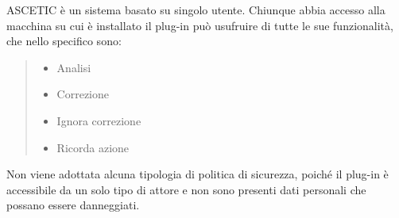 


ASCETIC è un sistema basato su singolo utente. Chiunque abbia accesso alla macchina su cui è installato il plug-in può usufruire di tutte le sue funzionalità, che nello specifico sono:

	\begin{quote}
	
	\begin{itemize}
		
		\item Analisi
		
		\item Correzione
		
		\item Ignora correzione
		
		\item Ricorda azione
		
	\end{itemize}
	\end{quote}

Non viene adottata alcuna tipologia di politica di sicurezza, poiché il plug-in è accessibile da un solo tipo di attore e non sono presenti dati personali che possano essere danneggiati.
		